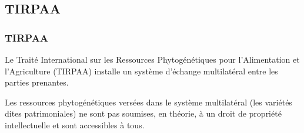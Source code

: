 \subsection{TIRPAA}
\begin{frame}
\frametitle{TIRPAA}

Le Traité International sur les Ressources Phytogénétiques pour l’Alimentation et l’Agriculture
(TIRPAA) installe un système d’échange multilatéral entre les parties prenantes. 

\vfill



Les ressources phytogénétiques versées dans le système multilatéral (les variétés dites patrimoniales) ne sont pas soumises, en théorie, à un droit de propriété intellectuelle et sont accessibles à tous. 

\vfill








\end{frame}
